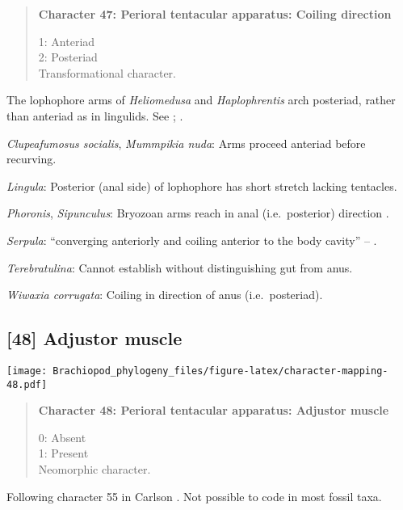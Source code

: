 \documentclass[openany]{book}
\theoremstyle{definition}
\theoremstyle{definition}
\theoremstyle{definition}
\theoremstyle{remark}
\begin{document}
\begin{quote}
\textbf{Character 47: Perioral tentacular apparatus: Coiling direction}

1: Anteriad\\
2: Posteriad\\
Transformational character.
\end{quote}

The lophophore arms of \emph{Heliomedusa} and \emph{Haplophrentis} arch
posteriad, rather than anteriad as in lingulids. See
\citet{Zhang2009Architectureand}; \citet{Moysiuk2017Hyolithsare}.

\hypertarget{Clupeafumosus_socialis-coding-47}{}
\emph{Clupeafumosus socialis}, \emph{Mummpikia nuda}: Arms proceed
anteriad before recurving.

\hypertarget{Lingula-coding-47}{}
\emph{Lingula}: Posterior (anal side) of lophophore has short stretch
lacking tentacles.

\hypertarget{Phoronis-coding-47}{}
\emph{Phoronis}, \emph{Sipunculus}: Bryozoan arms reach in anal
(i.e.~posterior) direction \citep{Shunkina2015}.

\hypertarget{Serpula-coding-47}{}
\emph{Serpula}: ``converging anteriorly and coiling anterior to the body
cavity'' -- \citet{Zhang2009Architectureand}.

\hypertarget{Terebratulina-coding-47}{}
\emph{Terebratulina}: Cannot establish without distinguishing gut from
anus.

\hypertarget{Wiwaxia_corrugata-coding-47}{}
\emph{Wiwaxia corrugata}: Coiling in direction of anus (i.e.~posteriad).

\subsection*{{[}48{]} Adjustor muscle}\label{adjustor-muscle}

\texttt{[image: Brachiopod\_phylogeny\_files/figure-latex/character-mapping-48.pdf]}

\begin{quote}
\textbf{Character 48: Perioral tentacular apparatus: Adjustor muscle}

0: Absent\\
1: Present\\
Neomorphic character.
\end{quote}

Following character 55 in Carlson
\citeyearpar{Carlson1995Phylogeneticrelationships}. Not possible to code
in most fossil taxa.
\end{document}
